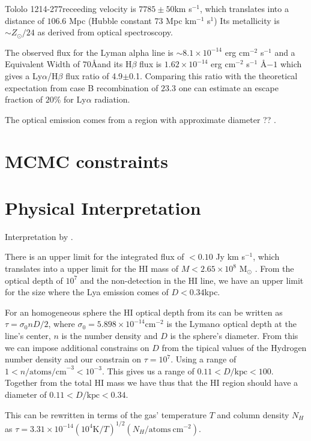 \documentclass[a4paper, usenatbib, 12pt]{article}
\newcommand{\tol}{Tololo 1214-277}
\begin{document}
{\tol receeding velocity is $7785\pm 50$km s$^{-1}$, which translates
into a distance of $106.6$ Mpc (Hubble constant 73 Mpc km$^{-1}$
s$^{1}$)
Its metallicity is $\sim Z_{\odot}/24$ \cite{Izotov04} as derived from optical
spectroscopy. 

The observed flux for the Lyman alpha line is $\sim
8.1\times 10^{-14}$ erg cm$^{-2}$ s$^{-1}$ \cite{Thuan97}
and a Equivalent Width of $70$\AA and its H$\beta$ flux is 
$1.62\times 10^{-14}$ erg cm$^{-2}$ s$^{-1}$ \AA${-1}$
\cite{Izotov04} which gives a Ly$\alpha$/H$\beta$ flux ratio of
4.9$\pm$0.1. 
Comparing this ratio with the theoretical expectation from case B
recombination of $23.3$ \cite{Hummer1987} one can estimate an escape
fraction of $20$\% for Ly$\alpha$ radiation.

The optical emission  comes from a   region with approximate diameter
?? \cite{Fricke01}. 

\section*{MCMC constraints}

\section*{Physical Interpretation}

Interpretation by \cite{mashesse03}.

There is an upper limit for the  
integrated flux of $<0.10$ Jy km s$^{-1}$, which translates into a
upper limit for the HI mass of $M<2.65\times 10^{8}$ M$_{\odot}$
\cite{pustilnikmartin07}. 
From the optical depth of $10^7$ and the non-detection in the HI line,
we have an upper limit for the size where the Lya emission comes of
$D<0.34$kpc. 

 For an homogeneous sphere the HI optical depth from its can be
 written as $\tau = \sigma_0 n D/2$, where $\sigma_0=5.898\times
10^{-14}$cm$^{-2}$ is the Lyman$\alpha$  optical depth at the 
line's center, $n$ is the number density and $D$ is the sphere's
diameter. 
From this we can impose additional constrains on $D$ from the tipical
values of the Hydrogen number density and our constrain on
$\tau=10^{7}$.  Using a range of $1<n/\mathrm{atoms/cm}^{-3} <
10^{-3}$. This gives us a range of $0.11 < D/\mathrm{kpc}<100$. 
Together from the total HI mass we have thus that the HI region should
have a diameter of $0.11 < D/\mathrm{kpc}<0.34$.



This can be rewritten in terms of the gas' temperature $T$ and column
density $N_{H}$as $\tau = 3.31 \times 10^{-14} (10^{4}\mathrm{K}/T)^{1/2}
(N_{H}/\mathrm{atoms\ cm}^{-2})$.  

}
\end{document}
